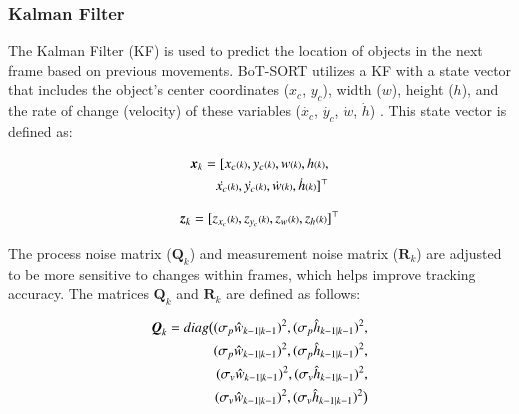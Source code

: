 \vspace{5pt}
\subsubsection{Kalman Filter}
\label{subsubsec:Kalman Filter}

The Kalman Filter (KF) is used to predict the location of objects in the next frame based on previous movements. BoT-SORT utilizes a KF with a state vector that includes the object's center coordinates ($x_c$, $y_c$), width ($w$), height ($h$), and the rate of change (velocity) of these variables ($\dot{x_c}$, $\dot{y_c}$, $\dot{w}$, $\dot{h}$) \cite{bewley2016simple, wojke2017simple}. This state vector is defined as:

\begin{equation}
  \begin{split}
    \vb*{x}_k = [x_{c}{\scriptstyle(k)}, y_{c}{\scriptstyle(k)}, w{\scriptstyle(k)}, h{\scriptstyle(k)}, \\        
    \dot{x_{c}}{\scriptstyle(k)}, \dot{y_{c}}{\scriptstyle(k)}, \dot{w}{\scriptstyle(k)}, \dot{h}{\scriptstyle(k)}]^\top
  \end{split}
\end{equation}

\begin{equation}
  \vb*{z}_k = [z_{x_c}{\scriptstyle(k)}, z_{y_c}{\scriptstyle(k)}, z_{w}{\scriptstyle(k)}, z_{h}{\scriptstyle(k)}]^\top
\end{equation}

The process noise matrix ($\mathbf{Q}_k$) and measurement noise matrix ($\mathbf{R}_k$) are adjusted to be more sensitive to changes within frames, which helps improve tracking accuracy. The matrices $\mathbf{Q}_k$ and $\mathbf{R}_k$ are defined as follows:

\begin{equation}
  \begin{split}
    \vb*{Q}_k = diag\big{(} (\sigma_{p} \hat{w}_{k-1|k-1})^2, (\sigma_{p} \hat{h}_{k-1|k-1})^2, \\
    (\sigma_{p} \hat{w}_{k-1|k-1})^2, (\sigma_{p} \hat{h}_{k-1|k-1})^2, \\
    (\sigma_{v} \hat{w}_{k-1|k-1})^2, (\sigma_{v} \hat{h}_{k-1|k-1})^2, \\ 
    (\sigma_{v} \hat{w}_{k-1|k-1})^2 ,(\sigma_{v} \hat{h}_{k-1|k-1})^2\big{)}
  \end{split}
\end{equation}

